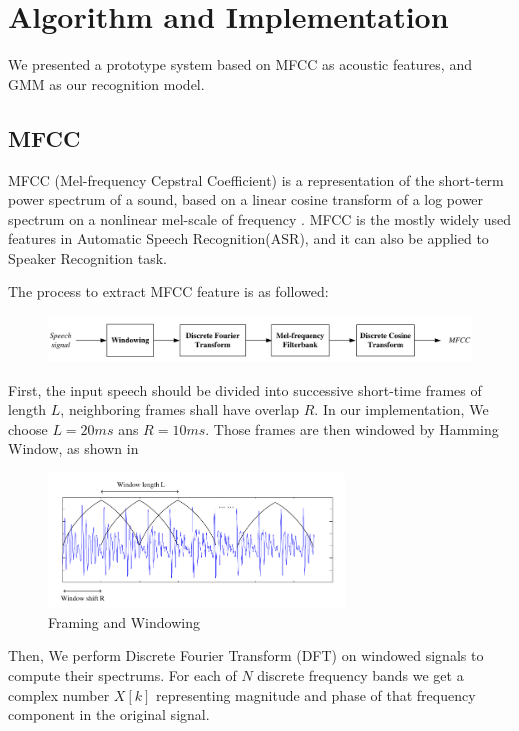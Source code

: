 
\section{Algorithm and Implementation}

We presented a prototype system based on MFCC as acoustic features, and
GMM as our recognition model.

\subsection{MFCC}
MFCC (Mel-frequency Cepstral Coefficient) is a representation of the short-term power spectrum of a sound,
based on a linear cosine transform of a log
power spectrum on a nonlinear mel-scale of frequency \cite{mfcc} .
MFCC is the mostly widely used features in Automatic Speech Recognition(ASR), and it can also be
applied to Speaker Recognition task.

The process to extract MFCC feature is as followed:
\begin{figure}[H]
  \centering
  \includegraphics[width=\textwidth]{res/MFCC.png}
\end{figure}

First, the input speech should be divided into successive short-time frames of length $L$,
neighboring frames shall have overlap $R$. In our implementation, We choose $L = 20ms  $ ans $ R = 10 ms$.
Those frames are then windowed by Hamming Window, as shown in 
\begin{figure}[H]
  \centering
  \includegraphics[width=0.7\textwidth]{res/frames.png}
  \caption{Framing and Windowing \label{fig:framming}}
\end{figure}

Then, We perform Discrete Fourier Transform (DFT) on windowed signals to compute their spectrums.
For each of $N$ discrete frequency bands we get a complex number $X[k]$ representing
magnitude and phase of that frequency component in the original signal.


